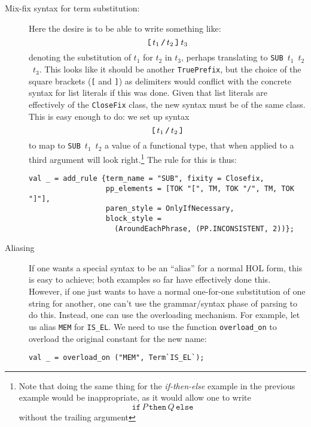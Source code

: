 {\begin{description}
\item[Mix-fix syntax for term substitution:] Here the desire is to be able
  to write something like:
  \[
  \mbox{\texttt{[}}\,t_1\,\mbox{\texttt{/}}\,t_2\,\mbox{\texttt{]}}\,t_3
  \]
  denoting the substitution of $t_1$ for $t_2$ in $t_3$, perhaps
  translating to \mbox{\texttt{SUB} $t_1$ $t_2$ $t_3$}.  This looks
like it should be another \texttt{TruePrefix}, but the choice of the
square brackets (\texttt{[} and \texttt{]}) as delimiters would
conflict with the concrete syntax for list literals if this was done.
Given that list literals are effectively of the \texttt{CloseFix}
class, the new syntax must be of the same class.  This is easy enough
to do: we set up syntax \[
\mbox{\texttt{[}}\,t_1\,\mbox{\texttt{/}}\,t_2\,\mbox{\texttt{]}}
  \] to map to \mbox{\texttt{SUB} $t_1$ $t_2$} a value of a functional
  type, that when applied to a third argument will look
  right.\footnote{Note that doing the same thing for the
    \textit{if-then-else} example in the previous example would be
    inappropriate, as it would allow one to write \[
    \texttt{if}\,P\,\texttt{then}\,Q\,\texttt{else}
    \] without the trailing argument}
  The rule for this is thus:
  \begin{verbatim}
val _ = add_rule {term_name = "SUB", fixity = Closefix,
                  pp_elements = [TOK "[", TM, TOK "/", TM, TOK "]"],
                  paren_style = OnlyIfNecessary,
                  block_style =
                    (AroundEachPhrase, (PP.INCONSISTENT, 2))};
\end{verbatim}

\item[Aliasing] If one wants a special syntax to be an ``alias'' for a
  normal HOL form, this is easy to achieve; both examples so far have
  effectively done this.  However, if one just wants to have a normal
  one-for-one substitution of one string for another, one can't use
  the grammar/syntax phase of parsing to do this.  Instead, one can
  use the overloading mechanism.  For example, let us alias
  \texttt{MEM} for \texttt{IS\_EL}.  We need to use the function
  \texttt{overload\_on} to overload the original constant for the new
  name:
  \begin{verbatim}
val _ = overload_on ("MEM", Term`IS_EL`);
\end{verbatim}


\end{description}}
